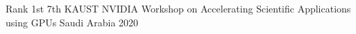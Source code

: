 



\begin{cvhonors}

  \cvhonor
    {Rank 1st} %
    {7th KAUST NVIDIA Workshop on Accelerating Scientific Applications using GPUs} %
    {Saudi Arabia} %
    {2020} %

%
%
%

\end{cvhonors}


%
%
%
%
%
%
